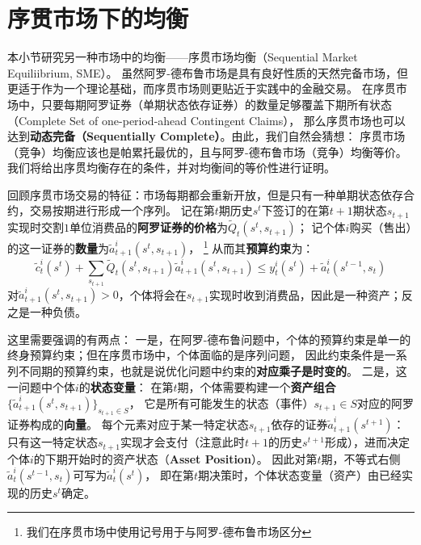 
\section{序贯市场下的均衡}  \label{sec-sq-market}

本小节研究另一种市场中的均衡——序贯市场均衡（Sequential Market Equiliibrium, SME）。
虽然阿罗-德布鲁市场是具有良好性质的天然完备市场，但更适于作为一个理论基础，而序贯市场则更贴近于实践中的金融交易。
在序贯市场中，只要每期阿罗证券（单期状态依存证券）的数量足够覆盖下期所有状态（Complete Set of one-period-ahead Contingent Claims），
那么序贯市场也可以达到\textbf{动态完备（Sequentially Complete）}。由此，我们自然会猜想：
序贯市场（竞争）均衡应该也是帕累托最优的，且与阿罗-德布鲁市场（竞争）均衡等价。我们将给出序贯均衡存在的条件，并对均衡间的等价性进行证明。

回顾序贯市场交易的特征：市场每期都会重新开放，但是只有一种单期状态依存合约，交易按期进行形成一个序列。
记在第$t$期历史$s^t$下签订的在第$t+1$期状态$s_{t+1}$实现时交割$1$单位消费品的\textbf{阿罗证券的价格}为$\tilde{Q}_t\left(s^t,s_{t+1}\right)$；
记个体$i$购买（售出）的这一证券的\textbf{数量}为$\tilde{a}_{t+1}^i\left(s^t,s_{t+1}\right)$，
\footnote{我们在序贯市场中使用$\tilde{}$记号用于与阿罗-德布鲁市场区分}
从而其\textbf{预算约束}为：
\begin{equation}    \label{eq-sq-bc}
    \tilde{c}_t^i\left(s^t\right)+\sum_{s_{t+1}} \tilde{Q}_t\left(s^t, s_{t+1}\right) \tilde{a}_{t+1}^i\left(s^t, s_{t+1}\right) 
        \leq y_t^i\left(s^t\right)+\tilde{a}_t^i\left(s^{t-1}, s_t\right)
\end{equation}
对$\tilde{a}_{t+1}^i\left(s^t,s_{t+1}\right)>0$，个体将会在$s_{t+1}$实现时收到消费品，因此是一种资产；反之是一种负债。

这里需要强调的有两点：
一是，在阿罗-德布鲁问题中，个体的预算约束是单一的终身预算约束；但在序贯市场中，个体面临的是序列问题，
因此约束条件是一系列不同期的预算约束，也就是说优化问题中约束的\textbf{对应乘子是时变的}。
二是，这一问题中个体$i$的\textbf{状态变量}：
在第$t$期，个体需要构建一个\textbf{资产组合}$\{\tilde{a}_{t+1}^i\left(s^t,s_{t+1}\right)\}_{s_{t+1}\in S}$，
它是所有可能发生的状态（事件）$s_{t+1}\in S$对应的阿罗证券构成的\textbf{向量}。
每个元素对应于某一特定状态$s_{t+1}$依存的证券$\tilde{a}_{t+1}^i\left(s^{t+1}\right)$：
只有这一特定状态$s_{t+1}$实现才会支付（注意此时$t+1$的历史$s^{t+1}$形成），进而决定个体$i$的下期开始时的资产状态（\textbf{Asset Position}）。
因此对第$t$期，不等式右侧$\tilde{a}_{t}^i\left(s^{t-1}, s_t\right)$可写为$\tilde{a}_t^i\left(s^t\right)$，
即在第$t$期决策时，个体状态变量（资产）由已经实现的历史$s^t$确定。

